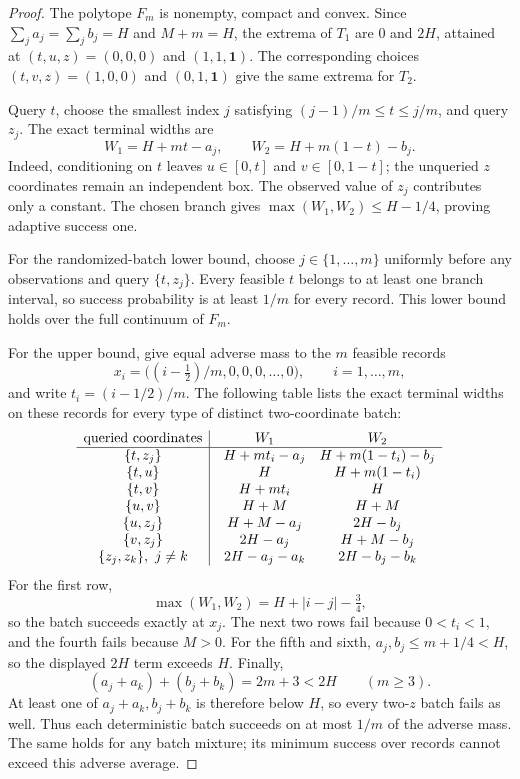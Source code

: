 \begin{proof}
The polytope $F_m$ is nonempty, compact and convex. Since
$\sum_j a_j=\sum_j b_j=H$ and $M+m=H$, the extrema of $T_1$ are
$0$ and $2H$, attained at $(t,u,z)=(0,0,0)$ and $(1,1,\boldsymbol1)$.
The corresponding choices $(t,v,z)=(1,0,0)$ and
$(0,1,\boldsymbol1)$ give the same extrema for $T_2$.

Query $t$, choose the smallest index $j$ satisfying
$(j-1)/m\leq t\leq j/m$, and query $z_j$. The exact terminal widths are
\begin{equation}
 W_1=H+mt-a_j,\qquad W_2=H+m(1-t)-b_j.
 \label{eq:two-target-boundary-widths}
\end{equation}
Indeed, conditioning on $t$ leaves $u\in[0,t]$ and $v\in[0,1-t]$;
the unqueried $z$ coordinates remain an independent box. The observed
value of $z_j$ contributes only a constant. The chosen branch gives
$\max(W_1,W_2)\leq H-1/4$, proving adaptive success one.

For the randomized-batch lower bound, choose $j\in\{1,\ldots,m\}$ uniformly before any
observations and query $\{t,z_j\}$. Every feasible $t$ belongs to at least
one branch interval, so success probability is at least $1/m$ for every
record. This lower bound holds over the full continuum of $F_m$.

For the upper bound, give equal adverse mass to the $m$ feasible records
\[
 x_i=\bigl((i-\tfrac12)/m,0,0,0,\ldots,0\bigr),
       \qquad i=1,\ldots,m,
\]
and write $t_i=(i-1/2)/m$. The following table lists the exact terminal
widths on these records for every type of distinct two-coordinate batch:
\[
\begin{array}{c|@{\quad}c@{\quad}c}
\text{queried coordinates}&W_1&W_2\\\hline
\{t,z_j\}&H+mt_i-a_j&H+m(1-t_i)-b_j\\
\{t,u\}&H&H+m(1-t_i)\\
\{t,v\}&H+mt_i&H\\
\{u,v\}&H+M&H+M\\
\{u,z_j\}&H+M-a_j&2H-b_j\\
\{v,z_j\}&2H-a_j&H+M-b_j\\
\{z_j,z_k\},\ j\ne k&2H-a_j-a_k&2H-b_j-b_k
\end{array}
\]
For the first row,
\[
 \max(W_1,W_2)=H+|i-j|-\tfrac34,
\]
so the batch succeeds exactly at $x_j$. The next two rows fail because
$0<t_i<1$, and the fourth fails because $M>0$. For the fifth and sixth,
$a_j,b_j\leq m+1/4<H$, so the displayed $2H$ term exceeds $H$.
Finally,
\[
 (a_j+a_k)+(b_j+b_k)=2m+3<2H \qquad(m\geq3).
\]
At least one of $a_j+a_k,b_j+b_k$ is therefore below $H$, so every
two-$z$ batch fails as well. Thus each deterministic batch succeeds on
at most $1/m$ of the adverse mass. The same holds for any batch mixture;
its minimum success over records cannot exceed this adverse average.


\end{proof}
